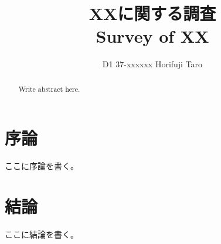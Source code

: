 \documentclass[10pt,a4paper,oneside,twocolumn,fleqn,dvipdfmx]{jarticle}
\title{XXに関する調査\\ Survey of XX}
\author{D1 37-xxxxxx Horifuji Taro}
\begin{document}

\begin{abstract}
    Write abstract here.
\end{abstract}

\maketitle

\section{序論}
ここに序論を書く。

\section{結論}
ここに結論を書く。

\small


\normalsize
\end{document}
